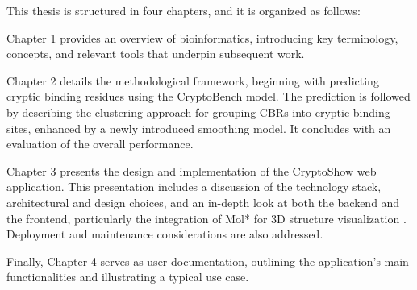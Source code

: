 This thesis is structured in four chapters, and it is organized as follows:

Chapter 1 provides an overview of bioinformatics, introducing key terminology, concepts, and relevant tools that underpin subsequent work.

Chapter 2 details the methodological framework, beginning with predicting cryptic binding residues using the CryptoBench model. The prediction is followed by describing the clustering approach for grouping CBRs into cryptic binding sites, enhanced by a newly introduced smoothing model. It concludes with an evaluation of the overall performance.

Chapter 3 presents the design and implementation of the CryptoShow web application. This presentation includes a discussion of the technology stack, architectural and design choices, and an in-depth look at both the backend and the frontend, particularly the integration of Mol* for 3D structure visualization \cite{sehnal2021mol}. Deployment and maintenance considerations are also addressed.

Finally, Chapter 4 serves as user documentation, outlining the application's main functionalities and illustrating a typical use case.
